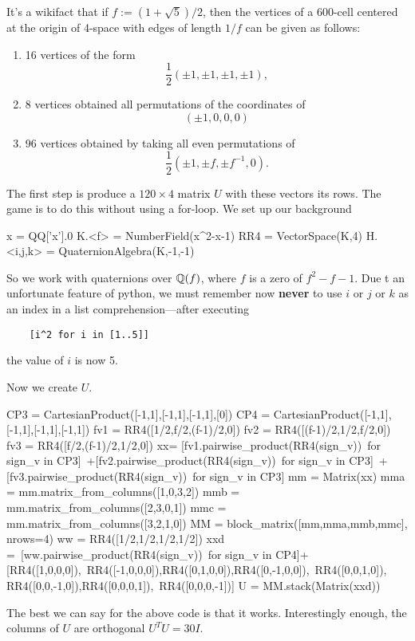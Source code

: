 It's a wikifact that if $f:=(1+\sqrt{5})/2$, then the vertices of a 600-cell 
centered at the origin of 4-space with edges of length $1/f$ 
can be given as follows: 
\begin{enumerate}
    \item
    16 vertices of the form
    \[
        \frac12(\pm1,\pm1,\pm1,\pm1),
    \]
    \item
    8 vertices obtained all permutations of the coordinates of
    \[
        (\pm1,0,0,0)
    \]
    \item
    96 vertices obtained by taking all even permutations of
    \[
        \frac12\left(\pm1,\pm f,\pm f^{-1},0\right).
    \]
\end{enumerate}  
The first step is produce a $120\times4$ matrix $U$ with these vectors
its rows. The game is to do this without using a for-loop.
We set up our background
\begin{sageblock}
    x = QQ['x'].0
    K.<f> = NumberField(x^2-x-1)
    RR4 = VectorSpace(K,4) 
    H.<i,j,k> = QuaternionAlgebra(K,-1,-1)
\end{sageblock}
So we work with quaternions over ${\mathbb Q}(f)$, where $f$ is a zero of $f^2-f-1$.
Due t an unfortunate feature of python, we must remember now \textbf{never}
to use $i$ or $j$ or $k$ as an index in a list comprehension---after
executing
\begin{verbatim}
    [i^2 for i in [1..5]]
\end{verbatim}
the value of $i$ is now 5.

Now we create $U$. 
\begin{sageblock}    
    CP3 = CartesianProduct([-1,1],[-1,1],[-1,1],[0])
    CP4 = CartesianProduct([-1,1],[-1,1],[-1,1],[-1,1])
    fv1 = RR4([1/2,f/2,(f-1)/2,0])
    fv2 = RR4([(f-1)/2,1/2,f/2,0])
    fv3 = RR4([f/2,(f-1)/2,1/2,0])
    xx= [fv1.pairwise_product(RR4(sign_v))\
      for sign_v in CP3]\
     +[fv2.pairwise_product(RR4(sign_v))\
      for sign_v in CP3]\
     +[fv3.pairwise_product(RR4(sign_v))\
      for sign_v in CP3]
    mm = Matrix(xx)
    mma = mm.matrix_from_columns([1,0,3,2])
    mmb = mm.matrix_from_columns([2,3,0,1])
    mmc = mm.matrix_from_columns([3,2,1,0])
    MM = block_matrix([mm,mma,mmb,mmc], nrows=4)
    ww = RR4([1/2,1/2,1/2,1/2])
    xxd =\ 
      [ww.pairwise_product(RR4(sign_v))\
      for sign_v in CP4]+[RR4([1,0,0,0]),\  
      RR4([-1,0,0,0]),RR4([0,1,0,0]),RR4([0,-1,0,0]),\ 
      RR4([0,0,1,0]), RR4([0,0,-1,0]),RR4([0,0,0,1]),\
      RR4([0,0,0,-1])]
    U = MM.stack(Matrix(xxd))
\end{sageblock}
The best we can say for the above code is that it works. Interestingly
enough, the columns of $U$ are orthogonal $U^TU =30I$.

